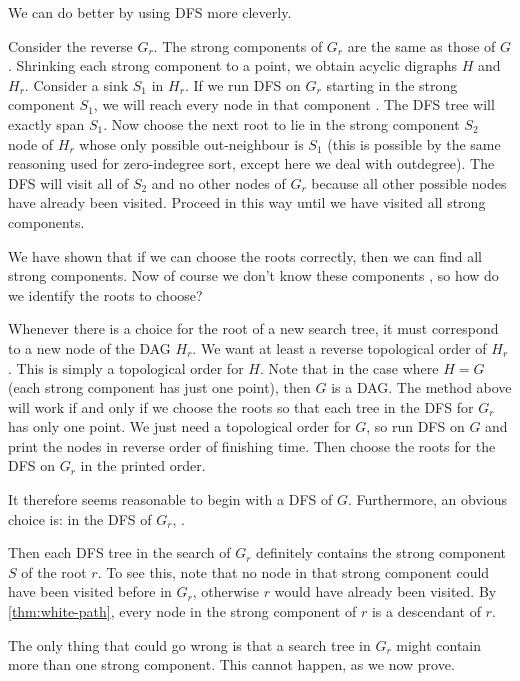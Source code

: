 We can do better by using DFS more cleverly. 

Consider the reverse $G_r$. The strong components of $G_r$ are the
same as those of $G$. Shrinking each strong component to a point,
we obtain  acyclic digraphs $H$ and $H_r$. Consider a sink $S_1$ in
$H_r$. If we run DFS on $G_r$ starting  in the strong component
$S_1$, we will reach every node in that component . The DFS tree will exactly span $S_1$. Now
choose the next root to lie in the strong component $S_2$ node of
$H_r$ whose only possible out-neighbour is $S_1$ (this is possible
by the same reasoning used for zero-indegree sort, except here we
deal with outdegree). The DFS will visit all of $S_2$ and no other
nodes of $G_r$ because all other possible nodes have already been
visited. Proceed in this way until we have visited all strong
components.

We have shown that if we can choose the roots correctly, then we can
find all strong components. Now of course we don't know these components
, so how do we identify the roots to choose?

Whenever there is a choice for the root of a new search tree, it must
correspond to a new node of the DAG $H_r$. We want at least a reverse
topological order of $H_r$. This is simply a topological order for
$H$. Note that in the case where $H=G$ (each strong component has just
one point), then $G$ is a DAG. The method above will work if and only
if we choose the roots so that each tree in the DFS for $G_r$ has only
one point. We just need a topological order for $G$, so run DFS on $G$
and print the nodes in reverse order of finishing time. Then choose the
roots for the DFS on $G_r$ in the printed order.

It therefore seems reasonable to begin with a DFS of $G$. Furthermore,
an obvious choice is: in the DFS of $G_r$, .

Then each DFS tree in the search of $G_r$ definitely contains the strong
component $S$ of the root $r$. To see this, note that no node in that
strong component could have been visited before in $G_r$, otherwise $r$
would have already been visited. By \cref{thm:white-path}, every
node in the strong component of $r$ is a descendant of $r$.

The only thing that could go wrong is that a search tree in $G_r$
might contain more than one strong component. This cannot happen,
as we now prove.

